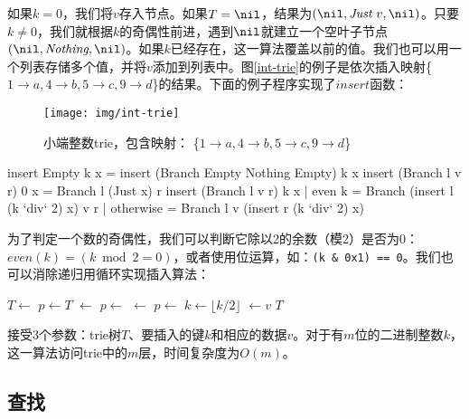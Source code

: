\documentclass[b5paper]{ctexart}
\begin{document}
如果$k = 0$，我们将$v$存入节点。如果$T = \nil$，结果为$(\nil, \textit{Just}\ v, \nil)$。只要$k \neq 0$，我们就根据$k$的奇偶性前进，遇到$\nil$就建立一个空叶子节点$(\nil, \textit{Nothing}, \nil)$。如果$k$已经存在，这一算法覆盖以前的值。我们也可以用一个列表存储多个值，并将$v$添加到列表中。图\ref{int-trie}的例子是依次插入映射\{$ 1 \rightarrow a, 4 \rightarrow b, 5 \rightarrow c, 9 \rightarrow d$\}的结果。下面的例子程序实现了$insert$函数：

\begin{figure}[htbp]
  \centering
  \texttt{[image: img/int-trie]}
  \caption{小端整数trie，包含映射：
          \{$ 1 \rightarrow a, 4 \rightarrow b, 5 \rightarrow c, 9 \rightarrow d$\}}
  \label{fig:int-trie}
\end{figure}

\begin{Haskell}
insert Empty k x = insert (Branch Empty Nothing Empty) k x
insert (Branch l v r) 0 x = Branch l (Just x) r
insert (Branch l v r) k x | even k    = Branch (insert l (k `div` 2) x) v r
                          | otherwise = Branch l v (insert r (k `div` 2) x)
\end{Haskell}

为了判定一个数的奇偶性，我们可以判断它除以2的余数（模2）是否为0：$even(k) = (k \bmod 2 = 0)$，或者使用位运算，如：\texttt{(k \& 0x1) == 0}。我们也可以消除递归用循环实现插入算法：

\begin{algorithmic}[1]
    \State $T \gets$   
  \EndIf
  \State $p \gets T$
        \State {} $\gets$ 
      \EndIf
      \State $p \gets$ 
    \Else
        \State {} $\gets$ 
      \EndIf
      \State $p \gets$ 
    \EndIf
    \State $k \gets \lfloor k/2 \rfloor$
  \EndWhile
  \State {} $\gets v$
  \State \Return $T$
\EndFunction
\end{algorithmic}

接受3个参数：trie树$T$、要插入的键$k$和相应的数据$v$。对于有$m$位的二进制整数$k$，这一算法访问trie中的$m$层，时间复杂度为$O(m)$。

\subsection{查找}
\end{document}
